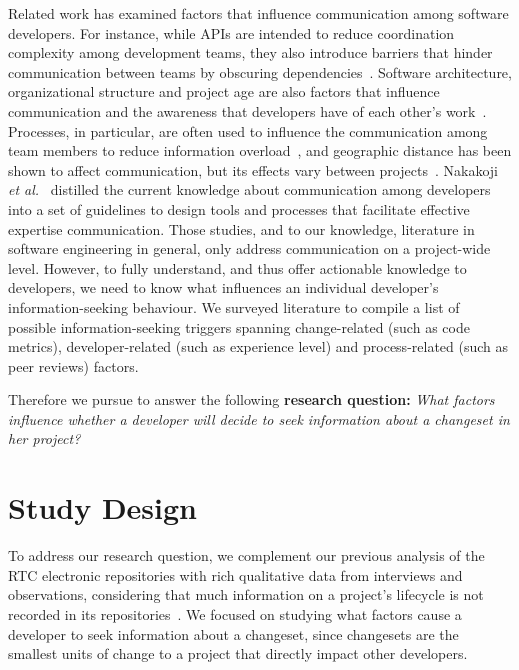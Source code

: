 Related work has examined factors that influence communication among software developers. For instance, while APIs are intended to reduce coordination complexity among development teams, they also introduce barriers that hinder communication between teams by obscuring dependencies~\cite{souza:cscw:2004,desouza:fse:2004}.
Software architecture, organizational structure and project age are also factors that influence communication and the awareness that developers have of each other's work~\cite{cleidson:tse:2011}. 
Processes, in particular, are often used to influence the communication among team members to reduce information overload~\cite{fussell:cscw:1998}, and geographic distance has been shown to affect communication, but its effects vary between projects~\cite{herbsleb:icse:2001,wolf:spip:2008}.
Nakakoji \emph{et al.}~\cite{nakakoji2010:rdc} distilled the current knowledge about communication among developers into a set of guidelines to design tools and processes that facilitate effective expertise communication.
Those studies, and to our knowledge, literature in software engineering in general, only address communication on a project-wide level. However, to fully understand, and thus offer actionable knowledge to developers, we need to know what influences an individual developer's information-seeking behaviour.
We surveyed literature to compile a list of possible information-seeking triggers spanning change-related (such as code metrics), developer-related (such as experience level) and process-related (such as peer reviews) factors.

Therefore we pursue to answer the following \textbf{research question:}
 \emph{What factors influence whether a developer will decide to seek information about a changeset in her project?}


\section{Study Design}
\label{sec:studydesign}

To address our research question, we complement our previous analysis of the RTC electronic repositories with rich qualitative data from interviews and observations, considering that much information on a project's lifecycle is not recorded in its repositories~\cite{aranda:icse:2009}. We focused on studying what factors cause a developer to seek information about a changeset, since changesets are the smallest units of change to a project that directly impact other developers.

